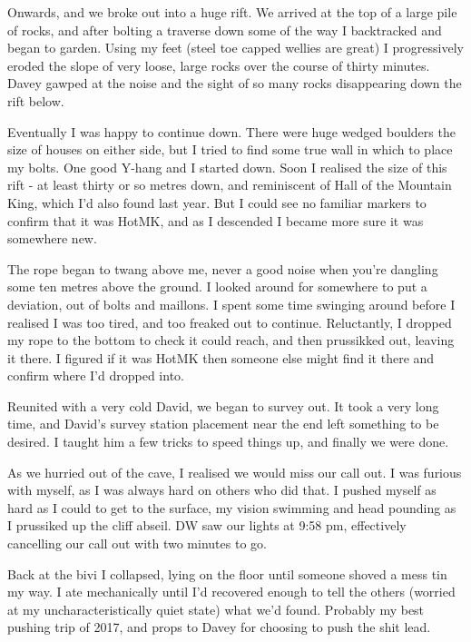 Onwards, and we broke out into a huge rift. We arrived at the top of a large pile of rocks, and after bolting a traverse down some of the way I backtracked and began to garden. Using my feet (steel toe capped wellies are great) I progressively eroded the slope of very loose, large rocks over the course of thirty minutes. Davey gawped at the noise and the sight of so many rocks disappearing down the rift below.

Eventually I was happy to continue down. There were huge wedged boulders the size of houses on either side, but I tried to find some true wall in which to place my bolts. One good Y-hang and I started down. Soon I realised the size of this rift - at least thirty or so metres down, and reminiscent of Hall of the Mountain King, which I’d also found last year. But I could see no familiar markers to confirm that it was HotMK, and as I descended I became more sure it was somewhere new.

The rope began to twang above me, never a good noise when you’re dangling some ten metres above the ground. I looked around for somewhere to put a deviation, out of bolts and maillons. I spent some time swinging around before I realised I was too tired, and too freaked out to continue. Reluctantly, I dropped my rope to the bottom to check it could reach, and then prussikked out, leaving it there. I figured if it was HotMK then someone else might find it there and confirm where I’d dropped into.

Reunited with a very cold David, we began to survey out. It took a very long time, and David’s survey station placement near the end left something to be desired. I taught him a few tricks to speed things up, and finally we were done.

As we hurried out of the cave, I realised we would miss our call out. I was furious with myself, as I was always hard on others who did that. I pushed myself as hard as I could to get to the surface, my vision swimming and head pounding as I prussiked up the cliff abseil. DW saw our lights at 9:58 pm, effectively cancelling our call out with two minutes to go.

Back at the bivi I collapsed, lying on the floor until someone shoved a mess tin my way. I ate mechanically until I’d recovered enough to tell the others (worried at my uncharacteristically quiet state) what we’d found. Probably my best pushing trip of 2017, and props to Davey for choosing to push the shit lead.

